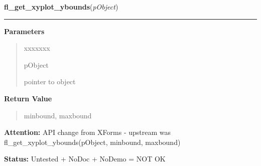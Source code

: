 \hspace{.8\funcindent}\begin{boxedminipage}{\funcwidth}

    \raggedright \textbf{fl\_get\_xyplot\_ybounds}(\textit{pObject})

    \vspace{-1.5ex}

    \rule{\textwidth}{0.5\fboxrule}
\setlength{\parskip}{2ex}
\setlength{\parskip}{1ex}
      \textbf{Parameters}
      \vspace{-1ex}

      \begin{quote}
        \begin{Ventry}{xxxxxxx}

          \item[pObject]

          pointer to object

        \end{Ventry}

      \end{quote}

      \textbf{Return Value}
    \vspace{-1ex}

      \begin{quote}
      minbound, maxbound

      \end{quote}

\textbf{Attention:} API change from XForms - upstream was fl\_get\_xyplot\_ybounds(pObject, 
minbound, maxbound)



\textbf{Status:} Untested + NoDoc + NoDemo = NOT OK



    \end{boxedminipage}

    \label{xformslib:library:fl_get_xyplot}

    \vspace{0.5ex}

